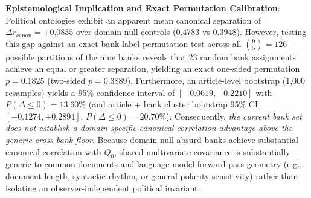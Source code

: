 \textbf{Epistemological Implication and Exact Permutation Calibration}: Political ontologies exhibit an apparent mean canonical separation of $\Delta r_{\mathrm{canon}} = \mathbf{+0.0835}$ over domain-null controls ($0.4783$ vs $0.3948$). However, testing this gap against an exact bank-label permutation test across all $\binom{9}{5} = 126$ possible partitions of the nine banks reveals that 23 random bank assignments achieve an equal or greater separation, yielding an exact one-sided permutation $p = \mathbf{0.1825}$ (two-sided $p = \mathbf{0.3889}$). Furthermore, an article-level bootstrap (1,000 resamples) yields a 95\% confidence interval of $[-0.0619, +0.2210]$ with $P(\Delta \le 0) = 13.60\%$ (and article + bank cluster bootstrap 95\% CI $[-0.1274, +0.2894]$, $P(\Delta \le 0) = 20.70\%$). Consequently, \emph{the current bank set does not establish a domain-specific canonical-correlation advantage above the generic cross-bank floor}. Because domain-null absurd banks achieve substantial canonical correlation with $Q_0$, shared multivariate covariance is substantially generic to common documents and language model forward-pass geometry (e.g., document length, syntactic rhythm, or general polarity sensitivity) rather than isolating an observer-independent political invariant.


